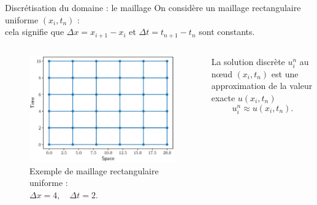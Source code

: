 \documentclass[aspectratio=169, french]{beamer}
\begin{document}
\begin{frame}{Discrétisation du domaine : le maillage}
On considère un maillage rectangulaire uniforme $(x_i, t_n)$ : \\
cela signifie que $\Delta x = x_{i+1}- x_i $ et $\Delta t = t_{n+1}- t_n$ sont constants. \\
  

	\begin{columns}
	\begin{column}{.5\textwidth}
	\begin{figure}
		\includegraphics[height=.5\textheight]{mesh.eps}
		\caption*{Exemple de maillage rectangulaire uniforme :\\ $\Delta x = 4, \quad \Delta t=2$.}
	\end{figure}	
	\end{column}
	\begin{column}{.5\textwidth}
		\begin{tcolorbox}
			La solution discrète $u_{i}^n$ au n\oe{}ud $(x_i, t_n)$ est une approximation  de la valeur exacte $u(x_i, t_n)$
			\begin{equation*}
				u_{i}^n \approx u(x_i, t_n).
			\end{equation*} 
		\end{tcolorbox}
	
	\end{column}
\end{columns}	

\end{frame}
\end{document}
